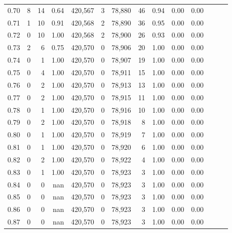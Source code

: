 \begin{tabular}{rrrrrrrrrrrrrr}
0.70 &       8 &     14 &  0.64 &  420,567 &        3 &  78,880 &      46 &  0.94 &  0.00 &      0.00 \\
0.71 &       1 &     10 &  0.91 &  420,568 &        2 &  78,890 &      36 &  0.95 &  0.00 &      0.00 \\
0.72 &       0 &     10 &  1.00 &  420,568 &        2 &  78,900 &      26 &  0.93 &  0.00 &      0.00 \\
0.73 &       2 &      6 &  0.75 &  420,570 &        0 &  78,906 &      20 &  1.00 &  0.00 &      0.00 \\
0.74 &       0 &      1 &  1.00 &  420,570 &        0 &  78,907 &      19 &  1.00 &  0.00 &      0.00 \\
0.75 &       0 &      4 &  1.00 &  420,570 &        0 &  78,911 &      15 &  1.00 &  0.00 &      0.00 \\
0.76 &       0 &      2 &  1.00 &  420,570 &        0 &  78,913 &      13 &  1.00 &  0.00 &      0.00 \\
0.77 &       0 &      2 &  1.00 &  420,570 &        0 &  78,915 &      11 &  1.00 &  0.00 &      0.00 \\
0.78 &       0 &      1 &  1.00 &  420,570 &        0 &  78,916 &      10 &  1.00 &  0.00 &      0.00 \\
0.79 &       0 &      2 &  1.00 &  420,570 &        0 &  78,918 &       8 &  1.00 &  0.00 &      0.00 \\
0.80 &       0 &      1 &  1.00 &  420,570 &        0 &  78,919 &       7 &  1.00 &  0.00 &      0.00 \\
0.81 &       0 &      1 &  1.00 &  420,570 &        0 &  78,920 &       6 &  1.00 &  0.00 &      0.00 \\
0.82 &       0 &      2 &  1.00 &  420,570 &        0 &  78,922 &       4 &  1.00 &  0.00 &      0.00 \\
0.83 &       0 &      1 &  1.00 &  420,570 &        0 &  78,923 &       3 &  1.00 &  0.00 &      0.00 \\
0.84 &       0 &      0 &   nan &  420,570 &        0 &  78,923 &       3 &  1.00 &  0.00 &      0.00 \\
0.85 &       0 &      0 &   nan &  420,570 &        0 &  78,923 &       3 &  1.00 &  0.00 &      0.00 \\
0.86 &       0 &      0 &   nan &  420,570 &        0 &  78,923 &       3 &  1.00 &  0.00 &      0.00 \\
0.87 &       0 &      0 &   nan &  420,570 &        0 &  78,923 &       3 &  1.00 &  0.00 &      0.00 \\

\end{tabular}
